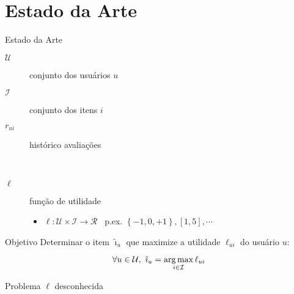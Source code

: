\section[Estado da Arte]{Estado da Arte}
\begin{frame}{Estado da Arte}
\begin{description}
	\item[$\mathcal{U}$] conjunto dos usuários $u$ 
	\item[$\mathcal{I}$] conjunto dos itens $i$ 
	\item[$r_{ui}$] histórico avaliações \par{~}
	\item[$\ell$] função de utilidade 
	\begin{itemize}
		\item $\ell: \mathcal{U} \times \mathcal{I} \rightarrow \mathcal{R}$ ~p.ex. $\left\{-1, 0, +1\right\}, \left[1, 5\right], \cdots$
	\end{itemize}
\end{description}


\begin{block}{Objetivo}
Determinar o item $\tilde{\imath}_u$ que maximize a utilidade $\ell_{ui}$ do usuário $u$:


\begin{equation} 
\label{eq:utilidade}
\forall u \in \mathcal{U}, ~ \tilde{\imath}_u = \operatorname*{arg\,max}_{i \in \mathcal{I}}{\ell_{ui}}
\end{equation}
\end{block}

\begin{alertblock}{Problema}
$\ell$ desconhecida
\end{alertblock}
\end{frame}




